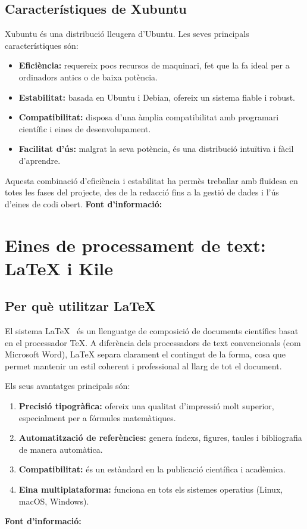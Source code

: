 \subsection{Característiques de Xubuntu}
Xubuntu és una distribució lleugera d’Ubuntu.  Les seves principals característiques són:
\begin{itemize}
  \item \textbf{Eficiència:} requereix pocs recursos de maquinari, fet que la fa ideal per a ordinadors antics o de baixa potència.
  \item \textbf{Estabilitat:} basada en Ubuntu i Debian, ofereix un sistema fiable i robust.
  \item \textbf{Compatibilitat:} disposa d’una àmplia compatibilitat amb programari científic i eines de desenvolupament.
  \item \textbf{Facilitat d’ús:} malgrat la seva potència, és una distribució intuïtiva i fàcil d’aprendre.
\end{itemize}

Aquesta combinació d’eficiència i estabilitat ha permès treballar amb fluïdesa en totes les fases del projecte, des de la redacció fins a la gestió de dades i l’ús d’eines de codi obert.
\textbf{Font d'informació:} \cite{A3}
\section{Eines de processament de text: LaTeX i Kile}
\subsection{Per què utilitzar LaTeX}
El sistema LaTeX~\cite{LaTeX} és un llenguatge de composició de documents científics basat en el processador TeX. A diferència dels processadors de text convencionals (com Microsoft Word), LaTeX separa clarament el contingut de la forma, cosa que permet mantenir un estil coherent i professional al llarg de tot el document.

Els seus avantatges principals són:
\begin{enumerate}
  \item \textbf{Precisió tipogràfica:} ofereix una qualitat d’impressió molt superior, especialment per a fórmules matemàtiques.
  \item \textbf{Automatització de referències:} genera índexs, figures, taules i bibliografia de manera automàtica.
  \item \textbf{Compatibilitat:} és un estàndard en la publicació científica i acadèmica.
  \item \textbf{Eina multiplataforma:} funciona en tots els sistemes operatius (Linux, macOS, Windows).
\end{enumerate}
\textbf{Font d'informació:} \cite{A4}
